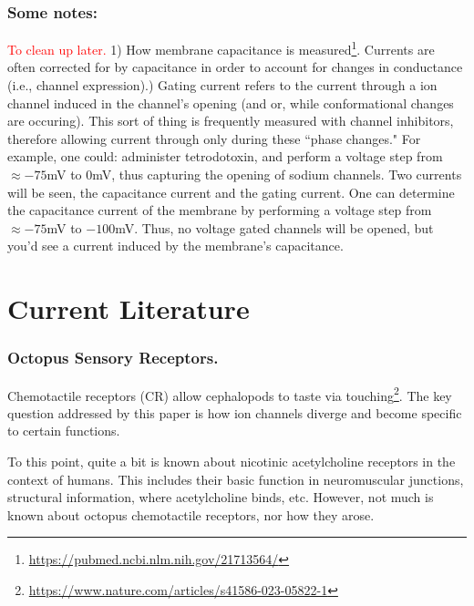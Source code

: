 \documentclass[12pt]{report}
\begin{document}
\subsubsection{Some notes:}
\textcolor{red}{To clean up later.}
1) How membrane capacitance is measured\footnote{\url{https://pubmed.ncbi.nlm.nih.gov/21713564/}}. Currents are often corrected for by capacitance in order to account for changes in conductance (i.e., channel expression).) Gating current refers to the current through a ion channel induced in the channel's opening (and or, while conformational changes are occuring). This sort of thing is frequently measured with channel inhibitors, therefore allowing current through only during these ``phase changes." For example, one could: administer tetrodotoxin, and perform a voltage step from $\approx -75$mV to 0mV, thus capturing the opening of sodium channels. Two currents will be seen, the capacitance current and the gating current. One can determine the capacitance current of the membrane by performing a voltage step from $\approx -75$mV to $-100$mV. Thus, no voltage gated channels will be opened, but you'd see a current induced by the membrane's capacitance.



\section{Current Literature}

\subsubsection{Octopus Sensory Receptors.}
Chemotactile receptors (CR) allow cephalopods to taste via touching\footnote{\url{https://www.nature.com/articles/s41586-023-05822-1}}. The key question addressed by this paper is how ion channels diverge and become specific to certain functions.\newline

To this point, quite a bit is known about nicotinic acetylcholine receptors in the context of humans. This includes their basic function in neuromuscular junctions, structural information, where acetylcholine binds, etc. However, not much is known about octopus chemotactile receptors, nor how they arose.\newline
\end{document}
